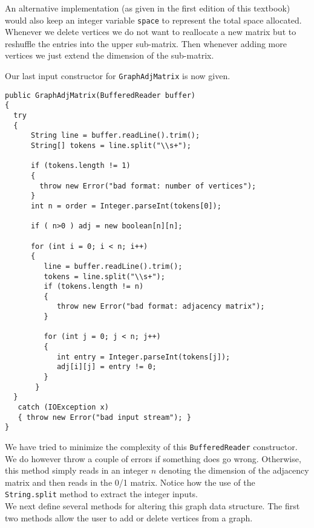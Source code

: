 %
An alternative implementation (as given in the first edition of this
textbook) would also keep an integer variable \verb|space| to represent 
the total space allocated.  Whenever we delete vertices we do not want 
to reallocate a new matrix but to reshuffle the entries into the upper 
sub-matrix.
Then whenever adding more  vertices we just extend the dimension of
the sub-matrix.

Our last input constructor for \verb|GraphAdjMatrix| is now given.

{\renewcommand{\ttdefault}{pcr} %
\footnotesize \begin{verbatim}
public GraphAdjMatrix(BufferedReader buffer)
{
  try
  {
      String line = buffer.readLine().trim();
      String[] tokens = line.split("\\s+");
  
      if (tokens.length != 1)
      {
        throw new Error("bad format: number of vertices");
      }
      int n = order = Integer.parseInt(tokens[0]);
  
      if ( n>0 ) adj = new boolean[n][n];
  
      for (int i = 0; i < n; i++)
      {
         line = buffer.readLine().trim();
         tokens = line.split("\\s+");
         if (tokens.length != n)
         {
            throw new Error("bad format: adjacency matrix");
         }
         
         for (int j = 0; j < n; j++)
         {
            int entry = Integer.parseInt(tokens[j]);
            adj[i][j] = entry != 0;
         }
       }
  }
   catch (IOException x) 
   { throw new Error("bad input stream"); }
}

\end{verbatim}%
}

We have tried to minimize the complexity of this \verb|BufferedReader| constructor.   We do however
throw a couple of errors if something does go wrong.   Otherwise, this method simply reads in an integer
$n$ denoting the dimension of the adjacency matrix and then reads in the 0/1 matrix.  Notice how the use
of the \verb|String.split| method to extract the integer inputs.\\


We next define several methods for altering this graph data structure.
The first two methods allow the user to add or delete vertices from a
graph.


